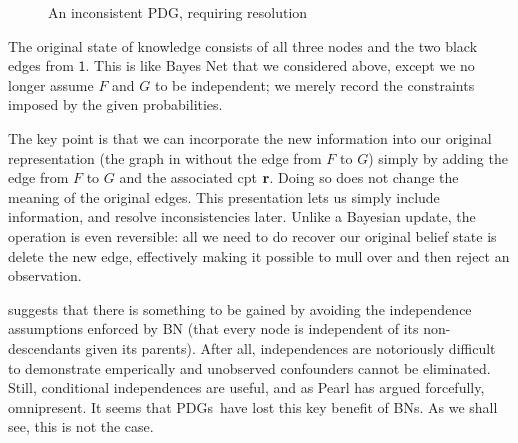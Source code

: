 \documentclass{article}
\newcommand{\MN}{PDG}
\newcommand{\MNs}{\MN s}
\numberwithin{equation}{section}
\begin{document}
\begin{example}
\begin{figure}[h]
{
			}
			\caption{An inconsistent \MN, requiring resolution}
			\label{fig:gun-floomp-diagram}
		\end{figure}


		The original state of knowledge consists of all three nodes and the two black edges from $\mathsf 1$. This is like Bayes Net that we considered above, except we no longer assume $F$ and $G$ to be independent; we merely record the constraints imposed by the given probabilities.
	
		The key point is that we can incorporate the new information into
		our original representation (the graph in 
		without the edge from $F$ to $G$) simply  by adding the edge from $F$
		to $G$ and the associated cpt $\mathbf r$.  Doing so does not change the meaning
		of the original edges.  This presentation lets us simply include
		information, and resolve inconsistencies later. Unlike a Bayesian
		update, the operation is even reversible: all we need to do recover
		our original belief state is delete the new edge, effectively making
		it possible to mull over and then reject an observation.
	\end{example}

	 suggests that there is something to be gained by avoiding the independence assumptions enforced by BN (that every node is independent of its non-descendants given its parents). After all, independences are notoriously difficult to demonstrate emperically and unobserved confounders cannot be eliminated.
	Still, conditional independences are useful, and as Pearl \parencite{pearl1989conditional} has argued forcefully, omnipresent.
	It seems that \MNs\ have lost this key benefit of BNs.  As we shall see, this is not the case.  
	
\end{document}
